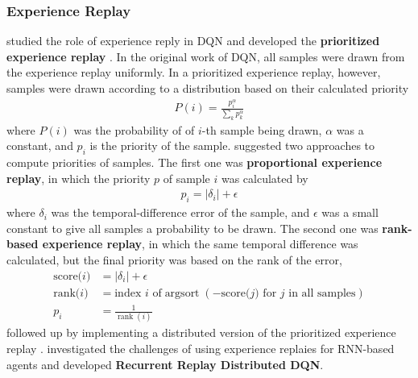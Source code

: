 \subsubsection{Experience Replay}
\citeauthor{PrioritizedExperienceReplay_Schaul.Quan.ea_2016} studied the role of experience reply in DQN and developed the \textbf{prioritized experience replay} \cite{PrioritizedExperienceReplay_Schaul.Quan.ea_2016}.
In the original work of DQN, all samples were drawn from the experience replay uniformly.
In a prioritized experience replay, however, samples were drawn according to a distribution based on their calculated priority
\begin{align*}
    P(i)=\frac{p_{i}^{\alpha}}{\sum_{k} p_{k}^{\alpha}}
\end{align*}
where $P(i)$ was the probability of of $i$-th sample being drawn, $\alpha$ was a constant, and $p_i$ is the priority of the sample.
\citeauthor{PrioritizedExperienceReplay_Schaul.Quan.ea_2016} suggested two approaches to compute priorities of samples.
The first one was \textbf{proportional experience replay}, in which the priority $p$ of sample $i$ was calculated by
\begin{align*}
    p_i = \left|\delta_{i}\right|+\epsilon
\end{align*}
where $\delta_{i}$ was the temporal-difference error of the sample, and $\epsilon$ was a small constant to give all samples a probability to be drawn.
The second one was \textbf{rank-based experience replay}, in which the same temporal difference was calculated, but the final priority was based on the rank of the error,
\begin{align*}
    \text{score($i$)}  & = \left|\delta_{i}\right|+\epsilon  \\
    \text{rank($i$)}   & = \text{index  $i$ of} \operatorname{argsort}(-\text{score($j$) for $j$ in all samples} )  \\
    p_{i}              & = \frac{1}{\operatorname{rank}(i)}
\end{align*}
\citeauthor{DistributedPrioritizedExperience_Horgan.Quan.ea_2018} followed up by implementing a distributed version of the prioritized experience replay \cite{DistributedPrioritizedExperience_Horgan.Quan.ea_2018}.
\citeauthor{RECURRENTEXPERIENCEREPLAY_Kapturowski.Ostrovski.ea_2019} investigated the challenges of using experience replaies for RNN-based agents and developed \textbf{Recurrent Replay Distributed DQN}.

